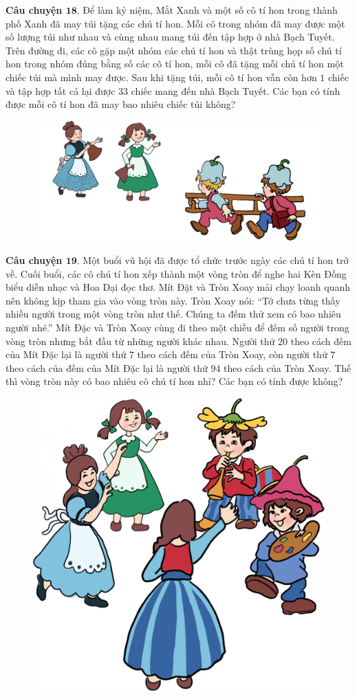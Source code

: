 	\textbf{\color{toancuabi}Câu chuyện $\pmb{18.}$} Để làm kỷ niệm, Mắt Xanh và một số cô tí hon trong thành phố Xanh đã may túi tặng các chú tí hon. Mỗi cô trong nhóm đã may được một số lượng túi như nhau và cùng nhau mang túi đến tập hợp ở nhà Bạch Tuyết. Trên đường đi, các cô gặp một nhóm các chú tí hon và thật trùng họp số chú tí hon trong nhóm đúng bằng số các cô tí hon, mỗi cô đã tặng mỗi chú tí hon một chiếc túi mà mình may được. Sau khi tặng túi, mỗi cô tí hon vẫn còn hơn $1$ chiếc và tập hợp tất cả lại được $33$ chiếc mang đến nhà Bạch Tuyết. Các bạn có tính được mỗi cô tí hon đã may bao nhiêu chiếc túi không?
		\begin{figure}[H]
		\centering
		\vspace*{-5pt}
		\captionsetup{labelformat= empty, justification=centering}
		\includegraphics[width=0.65\linewidth]{Hinh20_TangTui}
		\vspace*{-10pt}
	\end{figure}
	\textbf{\color{toancuabi}Câu chuyện $\pmb{19.}$} Một buổi vũ hội đã được tổ chức trước ngày các chú tí hon trở về. Cuối buổi, các cô chú tí hon xếp thành một vòng tròn để nghe hai Kèn Đồng biểu diễn nhạc và Hoa Dại đọc thơ. Mít Đặt và Tròn Xoay mải chạy loanh quanh nên không kịp tham gia vào vòng tròn này. Tròn Xoay nói: “Tớ chưa từng thấy nhiều người trong một vòng tròn như thế. Chúng ta đếm thử xem có bao nhiêu người nhé.” Mít Đặc và Tròn Xoay cùng đi theo một chiều để đếm số người trong vòng tròn nhưng bắt đầu từ những người khác nhau. Người thứ $20$ theo cách đếm của Mít Đặc lại là người thứ $7$ theo cách đếm của Tròn Xoay, còn người thứ $7$ theo cách của đếm của Mít Đặc lại là người thứ $94$ theo cách của Tròn Xoay. Thế thì vòng tròn này có bao nhiêu cô chú tí hon nhỉ? Các bạn có tính được không?
		\begin{figure}[H]
		\centering
		\vspace*{-5pt}
		\captionsetup{labelformat= empty, justification=centering}
		\includegraphics[width=0.5\linewidth]{Hinh21_VongTron}
		\vspace*{-15pt}
	\end{figure}
